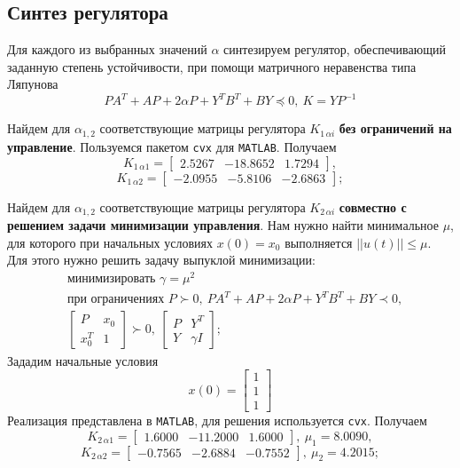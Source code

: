 \documentclass[a4paper, 12pt]{article}
\begin{document}
    \subsection{Синтез регулятора}
    Для каждого из выбранных значений $\alpha$ синтезируем регулятор, обеспечивающий
    заданную степень устойчивости, при помощи матричного неравенства типа Ляпунова
    $$
    PA^T+AP+2\alpha P+Y^TB^T+BY\preceq0,\ K=YP^{-1}
    $$


    Найдем для $\alpha_{1,2}$ соответствующие матрицы регулятора $K_{1\,\alpha i}$ \textbf{без ограничений на управление}.
    Пользуемся пакетом \texttt{cvx} для \texttt{MATLAB}. Получаем
    $$
    K_{1\,\alpha1}=\begin{bmatrix}
        2.5267  &-18.8652    &1.7294
    \end{bmatrix},
    $$
    $$
    K_{1\,\alpha2}=\begin{bmatrix}
        -2.0955   &-5.8106   &-2.6863
    \end{bmatrix};
    $$


    Найдем для $\alpha_{1,2}$ соответствующие матрицы регулятора $K_{2\,\alpha i}$ \textbf{совместно с решением задачи минимизации управления}.
    Нам нужно найти минимальное $\mu$, для которого при начальных условиях $x(0)=x_0$
    выполняется $||u(t)||\leq\mu$. Для этого нужно решить задачу выпуклой минимизации:
    \begin{align*}
    &\text{минимизировать }\gamma=\mu^2\\
    &\text{при ограничениях } P\succ0,\ PA^T+AP+2\alpha P+Y^TB^T+BY\prec0,\\
    &\begin{bmatrix}
        P &x_0\\
        x_0^T &1
    \end{bmatrix}\succ0,\ \begin{bmatrix}
        P &Y^T\\
        Y &\gamma I
    \end{bmatrix};
    \end{align*}
    Зададим начальные условия $$x(0)=\begin{bmatrix}
        1 \\1 \\1
    \end{bmatrix}$$
    Реализация представлена в \texttt{MATLAB}, для решения используется \texttt{cvx}. Получаем
    $$
    K_{2\,\alpha1}=\begin{bmatrix}
        1.6000  &-11.2000    &1.6000
    \end{bmatrix},\ \mu_1=8.0090,
    $$
    $$
    K_{2\,\alpha2}=\begin{bmatrix}
        -0.7565   &-2.6884   &-0.7552
    \end{bmatrix},\ \mu_2=4.2015;
    $$
\end{document}
